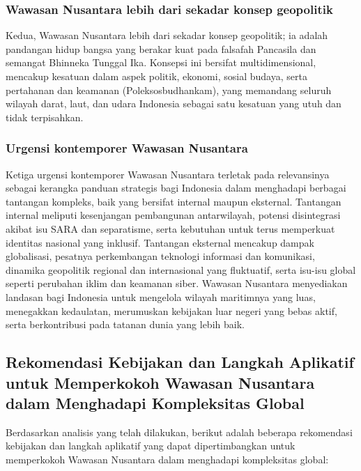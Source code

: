 \documentclass[12pt, a4paper]{article}
\begin{document}
\subsubsection*{Wawasan Nusantara lebih dari sekadar konsep geopolitik}
Kedua, Wawasan Nusantara lebih dari sekadar konsep geopolitik; ia adalah pandangan hidup bangsa yang berakar kuat pada falsafah Pancasila dan semangat Bhinneka Tunggal Ika. Konsepsi ini bersifat multidimensional, mencakup kesatuan dalam aspek politik, ekonomi, sosial budaya, serta pertahanan dan keamanan (Poleksosbudhankam), yang memandang seluruh wilayah darat, laut, dan udara Indonesia sebagai satu kesatuan yang utuh dan tidak terpisahkan.

\subsubsection*{Urgensi kontemporer Wawasan Nusantara} 
Ketiga urgensi kontemporer Wawasan Nusantara terletak pada relevansinya sebagai kerangka panduan strategis bagi Indonesia dalam menghadapi berbagai tantangan kompleks, baik yang bersifat internal maupun eksternal. Tantangan internal meliputi kesenjangan pembangunan antarwilayah, potensi disintegrasi akibat isu SARA dan separatisme, serta kebutuhan untuk terus memperkuat identitas nasional yang inklusif. Tantangan eksternal mencakup dampak globalisasi, pesatnya perkembangan teknologi informasi dan komunikasi, dinamika geopolitik regional dan internasional yang fluktuatif, serta isu-isu global seperti perubahan iklim dan keamanan siber. Wawasan Nusantara menyediakan landasan bagi Indonesia untuk mengelola wilayah maritimnya yang luas, menegakkan kedaulatan, merumuskan kebijakan luar negeri yang bebas aktif, serta berkontribusi pada tatanan dunia yang lebih baik.

\subsection*{Rekomendasi Kebijakan dan Langkah Aplikatif untuk Memperkokoh Wawasan Nusantara dalam Menghadapi Kompleksitas Global}
Berdasarkan analisis yang telah dilakukan, berikut adalah beberapa rekomendasi kebijakan dan langkah aplikatif yang dapat dipertimbangkan untuk memperkokoh Wawasan Nusantara dalam menghadapi kompleksitas global:
\end{document}
